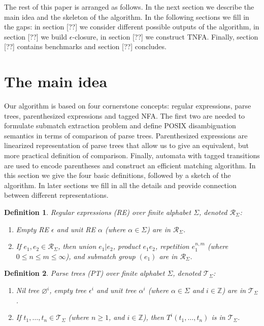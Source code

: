 \documentclass[AMA,STIX1COL]{WileyNJD-v2}
\newcommand{\XR}{\mathcal{R}}
\newcommand{\XT}{\mathcal{T}}
\newcommand{\YZ}{\mathbb{Z}}
\newtheorem{Xdef}{Definition}
\begin{document}
The rest of this paper is arranged as follows.
In the next section we describe the main idea and the skeleton of the algorithm.
In the following sections we fill in the gaps:
in section [??] we consider different possible outputs of the algorithm,
in section [??] we build $\epsilon$-closure,
in section [??] we construct TNFA.
Finally, section [??] contains benchmarks
and section [??] concludes.

\section{The main idea}\label{secion_main}

Our algorithm is based on four cornerstone concepts:
regular expressions, parse trees, parenthesized expressions and tagged NFA.
The first two are needed to formulate submatch extraction problem
and define POSIX disambiguation semantics in terms of comparison of parse trees.
Parenthesized expressions are linearized representation of parse trees
that allow us to give an equivalent, but more practical definition of comparison.
Finally, automata with tagged transitions are used to encode parentheses
and construct an efficient matching algorithm.
In this section we give the four basic definitions, followed by a sketch of the algorithm.
In later sections we fill in all the details and provide connection between different representations.

    \begin{Xdef}
    \emph{Regular expressions (RE)} over finite alphabet $\Sigma$, denoted $\XR_\Sigma$:
    \begin{enumerate}
        \item
          Empty RE $\epsilon$ and
          unit RE $\alpha$ (where $\alpha \in \Sigma$) are in $\XR_\Sigma$.
        \item If $e_1, e_2 \in \XR_\Sigma$, then
          union $e_1 | e_2$,
          product $e_1 e_2$,
          repetition $e_1^{n, m}$ (where $0 \leq n \leq m \leq \infty$), and
          submatch group $(e_1)$
          are in $\XR_\Sigma$.
    \end{enumerate}
    \end{Xdef}


    \begin{Xdef}
    \emph{Parse trees (PT)} over finite alphabet $\Sigma$, denoted $\XT_\Sigma$:
    \begin{enumerate}
        \item
          Nil tree ${\varnothing}^i$,
          empty tree ${\epsilon}^i$ and
          unit tree ${\alpha}^i$ (where $\alpha \in \Sigma$ and $i \in \YZ$)
          are in $\XT_\Sigma$.
        \item If $t_1, \dots, t_n \in \XT_\Sigma$ (where $n \geq 1$, and $i \in \YZ$), then
          ${T}^i(t_1, \dots, t_n)$
          is in $\XT_\Sigma$.
    \end{enumerate}
    \end{Xdef}
\end{document}
